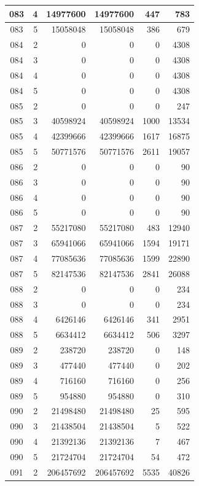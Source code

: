 \begin{longtable}{|c|r|r|r|r|r|}
\hline
083 & 4 & 14977600 & 14977600 & 447 & 783 \\
\hline
083 & 5 & 15058048 & 15058048 & 386 & 679 \\
\hline
084 & 2 & 0 & 0 & 0 & 4308 \\
\hline
084 & 3 & 0 & 0 & 0 & 4308 \\
\hline
084 & 4 & 0 & 0 & 0 & 4308 \\
\hline
084 & 5 & 0 & 0 & 0 & 4308 \\
\hline
085 & 2 & 0 & 0 & 0 & 247 \\
\hline
085 & 3 & 40598924 & 40598924 & 1000 & 13534 \\
\hline
085 & 4 & 42399666 & 42399666 & 1617 & 16875 \\
\hline
085 & 5 & 50771576 & 50771576 & 2611 & 19057 \\
\hline
086 & 2 & 0 & 0 & 0 & 90 \\
\hline
086 & 3 & 0 & 0 & 0 & 90 \\
\hline
086 & 4 & 0 & 0 & 0 & 90 \\
\hline
086 & 5 & 0 & 0 & 0 & 90 \\
\hline
087 & 2 & 55217080 & 55217080 & 483 & 12940 \\
\hline
087 & 3 & 65941066 & 65941066 & 1594 & 19171 \\
\hline
087 & 4 & 77085636 & 77085636 & 1599 & 22890 \\
\hline
087 & 5 & 82147536 & 82147536 & 2841 & 26088 \\
\hline
088 & 2 & 0 & 0 & 0 & 234 \\
\hline
088 & 3 & 0 & 0 & 0 & 234 \\
\hline
088 & 4 & 6426146 & 6426146 & 341 & 2951 \\
\hline
088 & 5 & 6634412 & 6634412 & 506 & 3297 \\
\hline
089 & 2 & 238720 & 238720 & 0 & 148 \\
\hline
089 & 3 & 477440 & 477440 & 0 & 202 \\
\hline
089 & 4 & 716160 & 716160 & 0 & 256 \\
\hline
089 & 5 & 954880 & 954880 & 0 & 310 \\
\hline
090 & 2 & 21498480 & 21498480 & 25 & 595 \\
\hline
090 & 3 & 21438504 & 21438504 & 5 & 522 \\
\hline
090 & 4 & 21392136 & 21392136 & 7 & 467 \\
\hline
090 & 5 & 21724704 & 21724704 & 54 & 472 \\
\hline
091 & 2 & 206457692 & 206457692 & 5535 & 40826 \\

\end{longtable}
